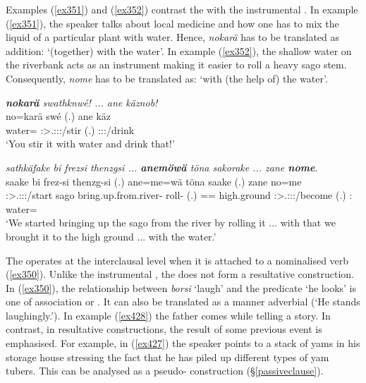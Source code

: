 Examples (\ref{ex351}) and (\ref{ex352}) contrast the   with the instrumental . In example (\ref{ex351}), the speaker talks about local medicine and how one has to mix the liquid of a particular plant with water. Hence, \emph{nokarä} has to be translated as addition: `(together) with the water'. In example (\ref{ex352}), the shallow water on the riverbank acts as an instrument making it easier to roll a heavy sago stem. Consequently, \emph{nome} has to be translated as: `with (the help of) the water'.

\begin{exe}
	\ex \emph{\textbf{nokarä} swathknwé! ... ane käznob!}\\
	\gll no=karä swé (.) ane käz\\
	water={\Prop} \Ssg:\Sbj>\Tsg.\Masc:\Obj:\Imp:\Ipfv/stir (.) {\Dem} \Ssg:\Sbj:\Imp:\Pfv/drink\\
	\trans `You stir it with water and drink that!'
	\label{ex351}
\end{exe}
\begin{exe}
	\ex \emph{sathkäfake bi frezsi thenzgsi ... \textbf{anemöwä} töna sakorake ... zane \textbf{nome}.}\\
	\gll saake bi frez-si thenzg-si (.) ane=me=wä töna saake (.) zane no=me\\
	\Fpl:\Sbj>\Tsg.\Masc:\Obj:\Pst:\Pfv/start sago bring.up.from.river-{\Nmlz} roll-{\Nmlz} (.) \Dem=\Ins={\Emph} high.ground \Fpl:\Sbj>\Tsg.\Masc:\Obj:\Pst:\Pfv/become (.) \Dem:{\Prox} water={\Ins}\\
	\trans `We started bringing up the sago from the river by rolling it ... with that we brought it to the high ground ... with the water.'
	\label{ex352}
\end{exe}

The   operates at the interclausal level when it is attached to a nominalised verb (\ref{ex350}). Unlike the instrumental , the  does not form a resultative construction. In (\ref{ex350}), the relationship between \emph{borsi} `laugh' and the predicate `he looks' is one of association or . It can also be translated as a manner adverbial (`He stands laughingly.'). In example (\ref{ex428}) the father comes while telling a story. In contrast, in resultative constructions, the result of some previous event is emphasised. For example, in (\ref{ex427}) the speaker points to a stack of yams in his storage house stressing the fact that he has piled up different types of yam tubers. This can be analysed as a pseudo- construction ({\S}\ref{passiveclause}).
	
